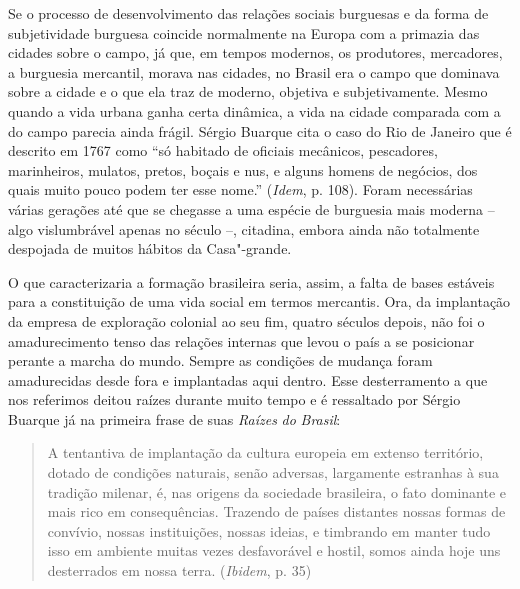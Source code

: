 Se o processo de desenvolvimento das relações sociais burguesas e da
forma de subjetividade burguesa coincide normalmente na Europa com a
primazia das cidades sobre o campo, já que, em tempos modernos, os
produtores, mercadores, a burguesia mercantil, morava nas cidades, no
Brasil era o campo que dominava sobre a cidade e o que ela traz de
moderno, objetiva e subjetivamente. Mesmo quando a vida urbana ganha
certa dinâmica, a vida na cidade comparada com a do campo parecia ainda
frágil. Sérgio Buarque cita o caso do Rio de Janeiro que é descrito em
1767 como ``só habitado de oficiais mecânicos, pescadores, marinheiros,
mulatos, pretos, boçais e nus, e alguns homens de negócios, dos quais
muito pouco podem ter esse nome.'' (\emph{Idem}, p. 108). Foram
necessárias várias gerações até que se chegasse a uma espécie de
burguesia mais moderna -- algo vislumbrável apenas no século  --,
citadina, embora ainda não totalmente despojada de muitos hábitos da
Casa"-grande.

O que caracterizaria a formação brasileira seria, assim, a falta de
bases estáveis para a constituição de uma vida social em termos
mercantis. Ora, da implantação da empresa de exploração colonial ao seu
fim, quatro séculos depois, não foi o amadurecimento tenso das relações
internas que levou o país a se posicionar perante a marcha do mundo.
Sempre as condições de mudança foram amadurecidas desde fora e
implantadas aqui dentro. Esse desterramento a que nos referimos deitou
raízes durante muito tempo e é ressaltado por Sérgio Buarque já na
primeira frase de suas \emph{Raízes} \emph{do} \emph{Brasil}:

\begin{quote}
A tentantiva de implantação da cultura europeia em extenso território,
dotado de condições naturais, senão adversas, largamente estranhas à sua
tradição milenar, é, nas origens da sociedade brasileira, o fato
dominante e mais rico em consequências. Trazendo de países distantes
nossas formas de convívio, nossas instituições, nossas ideias, e
timbrando em manter tudo isso em ambiente muitas vezes desfavorável e
hostil, somos ainda hoje uns desterrados em nossa terra. (\emph{Ibidem},
p. 35)
\end{quote}

